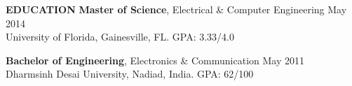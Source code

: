 \documentclass[10pt, letterpaper]{article}
\begin{document}
\textbf{EDUCATION}
\smallskip
\newline
{\bf Master of Science}, Electrical \& Computer Engineering \hfill May 2014\\
University of Florida, Gainesville, FL. \hfill GPA: 3.33/4.0

{\bf Bachelor of Engineering}, Electronics \& Communication \hfill May 2011\\
Dharmsinh Desai University, Nadiad, India. \hfill GPA: 62/100
\end{document}
